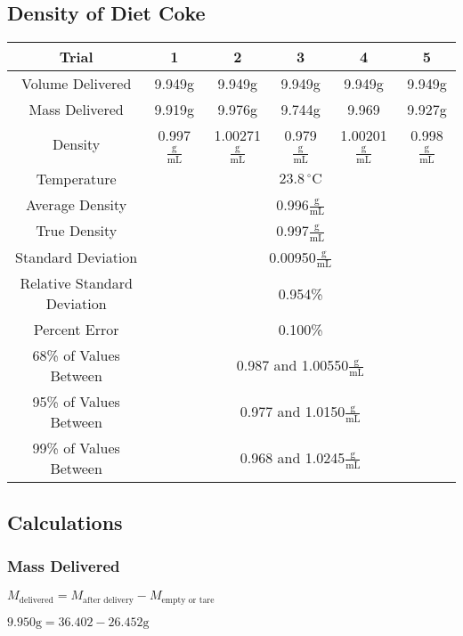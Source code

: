 \documentclass[fleqn,titlepage]{article}
\begin{document}
  \subsection*{Density of Diet Coke}
    \begin{center}
      \begin{tabular}{|c|c|c|c|c|c|}
        \hline
        Trial & 1 & 2 & 3 & 4 & 5 \\
        \hline
        Volume Delivered & 9.949g & 9.949g & 9.949g & 9.949g & 9.949g \\
        Mass Delivered & 9.919g & 9.976g & 9.744g & 9.969 & 9.927g  \\
        Density & 0.997$\frac{\text{g}}{\text{mL}}$ & 1.00271$\frac{\text{g}}{\text{mL}}$ & 0.979$\frac{\text{g}}{\text{mL}}$ & 1.00201$\frac{\text{g}}{\text{mL}}$ & 0.998$\frac{\text{g}}{\text{mL}}$  \\
        \hline
        Temperature & \multicolumn{5}{c|}{$23.8\,^{\circ}\mathrm{C}$} \\
        Average Density & \multicolumn{5}{c|}{0.996$\frac{\text{g}}{\text{mL}}$} \\
        True Density & \multicolumn{5}{c|}{0.997$\frac{\text{g}}{\text{mL}}$} \\
        Standard Deviation & \multicolumn{5}{c|}{0.00950$\frac{\text{g}}{\text{mL}}$} \\
        Relative Standard Deviation & \multicolumn{5}{c|}{0.954\%} \\
        Percent Error & \multicolumn{5}{c|}{0.100\%} \\
        68\% of Values Between & \multicolumn{5}{c|}{0.987 and 1.00550$\frac{\text{g}}{\text{mL}}$} \\
        95\% of Values Between & \multicolumn{5}{c|}{0.977 and 1.0150$\frac{\text{g}}{\text{mL}}$} \\
        99\% of Values Between & \multicolumn{5}{c|}{0.968 and 1.0245$\frac{\text{g}}{\text{mL}}$} \\
        \hline
      \end{tabular}
    \end{center}

  \subsection*{Calculations}
    \subsubsection*{Mass Delivered}
      \begin{center}$M_{\text{delivered}} = M_{\text{after delivery}} - M_{\text{empty or tare}}$\end{center}
      \begin{center}$9.950\text{g} = 36.402 - 26.452\text{g}$\end{center}
\end{document}
